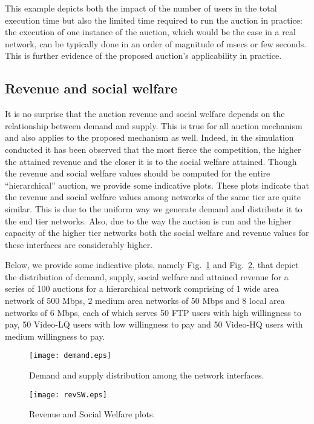 \documentclass[a4paper]{article}
\begin{document}
This example depicts both the impact of the number
of users in the total execution time but also the limited time required to
run the auction in practice: the execution of one instance of the auction,
which would be the case in a real network, can be typically done in an order
of magnitude of msecs or few seconds. This is further evidence of the proposed
auction's applicability in practice.


\subsection{Revenue and social welfare}

It is no surprise that the auction revenue and social welfare depends on 
the relationship between demand and supply. This is true for all auction
mechanism and also applies to the proposed mechanism as well. Indeed, 
in the simulation conducted it has been observed that the most fierce the 
competition, the higher the attained revenue and the closer it is to the
social welfare attained. Though the revenue and social welfare values should
be computed for the entire ``hierarchical'' auction, we provide some indicative
plots. These plots indicate that the revenue and social welfare values among 
networks of the same tier are quite similar. This is due to the uniform way 
we generate demand and distribute it to the end tier networks. Also, due to
the way the auction is run and the higher capacity of the higher tier networks
both the social welfare and revenue values for these interfaces are considerably
higher. 

Below, we provide some indicative plots, namely Fig.~\ref{fig:demand}
and Fig.~\ref{fig:revSW}, that depict the distribution of demand,
supply, social welfare and attained revenue for a series of 100 auctions for 
a hierarchical network comprising of
1 wide area network of 500 Mbps, 2 medium area networks of 50 Mbps and
8 local area networks of 6 Mbps, each of which serves 50 FTP users with
high willingness to pay, 50 Video-LQ users with low willingness to pay and
50 Video-HQ users with medium willingness to pay.


\begin{figure}[htbp]
	\centering\texttt{[image: demand.eps]}
	\caption{Demand and supply distribution among the network interfaces.}
	\label{fig:demand}
\end{figure}

\begin{figure}[htbp]
	\centering\texttt{[image: revSW.eps]}
	\caption{Revenue and Social Welfare plots.}
	\label{fig:revSW}
\end{figure}
\end{document}
